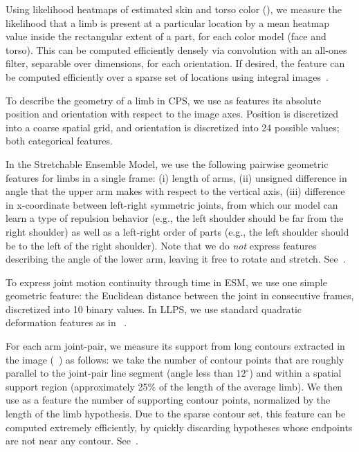  Using likelihood heatmaps of estimated 
skin and torso color (), we measure the likelihood that a limb is 
present at a particular location by a mean heatmap value inside the rectangular 
extent of a part, for each color model (face and torso). This can be computed 
efficiently densely via convolution with an all-ones filter, separable over 
dimensions, for each orientation.  If desired, the feature can be computed 
efficiently over a sparse set of locations using integral 
images~\citep{viola02}.

 To describe the geometry of a limb in CPS, 
we use as features its absolute position and orientation with respect to the 
image axes.  Position is discretized into a coarse spatial grid, and 
orientation is discretized into 24 possible values; both categorical features.

In the Stretchable Ensemble Model, we use the following pairwise geometric 
features for limbs in a single frame: (i) length of arms, (ii) unsigned 
difference in angle that the upper arm makes with respect to the vertical axis, 
(iii) difference in x-coordinate between left-right symmetric joints, from 
which our model can learn a type of repulsion behavior (e.g., the left shoulder 
should be far from the right shoulder) as well as a left-right order of parts 
(e.g., the left shoulder should be to the left of the right shoulder). Note 
that we do {\em not} express features describing the angle of the lower arm, 
leaving it free to rotate and stretch.
See~.

To express joint motion continuity through time in ESM, we use one simple 
geometric feature: the Euclidean distance between the joint in consecutive 
frames, discretized into 10 binary values.   In LLPS, we use standard quadratic deformation features as in~ \citep{felz05}.

  For each arm joint-pair, we measure its support 
from long contours extracted in the image (~) as follows: we take 
the number of contour points that are roughly parallel to the joint-pair line 
segment (angle less than $12^\circ$) and within a spatial support region 
(approximately 25\% of the length of the average limb).  We then use as a 
feature the number of supporting contour points, normalized by the length of 
the limb hypothesis.  Due to the sparse contour set, this feature can be 
computed extremely efficiently, by quickly discarding hypotheses whose 
endpoints are not near any contour.  See~.

